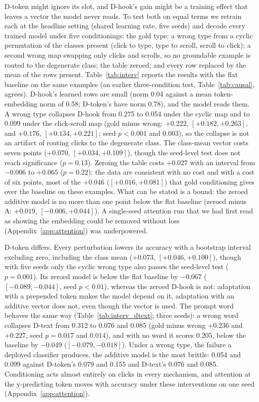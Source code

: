 \documentclass{article}
\begin{document}
D-token might ignore its slot, and D-hook's gain might be a training effect that leaves a vector the model never reads. To test both on equal terms we retrain each at the headline setting (shared learning rate, five seeds) and decode every trained model under five conditionings: the gold type; a wrong type from a cyclic permutation of the classes present (click to type, type to scroll, scroll to click); a second wrong map swapping only clicks and scrolls, so no groundable example is routed to the degenerate class; the table zeroed; and every row replaced by the mean of the rows present. Table~\ref{tab:interv} reports the results with the flat baseline on the same examples (an earlier three-condition test, Table~\ref{tab:causal}, agrees). D-hook's learned rows are small (norm 0.04 against a mean token-embedding norm of 0.58; D-token's have norm 0.78), and the model reads them. A wrong type collapses D-hook from 0.275 to 0.054 under the cyclic map and to 0.099 under the click-scroll map (gold minus wrong: $+0.222$, $[+0.182, +0.263]$, and $+0.176$, $[+0.134, +0.221]$; seed $p < 0.001$ and $0.003$), so the collapse is not an artifact of routing clicks to the degenerate class. The class-mean vector costs seven points ($+0.070$, $[+0.034, +0.109]$), though the seed-level test does not reach significance ($p = 0.13$). Zeroing the table costs $+0.027$ with an interval from $-0.006$ to $+0.065$ ($p = 0.22$): the data are consistent with no cost and with a cost of six points, most of the $+0.046$ ($[+0.016, +0.081]$) that gold conditioning gives over the baseline on these examples. What can be stated is a bound: the zeroed additive model is no more than one point below the flat baseline (zeroed minus A: $+0.019$, $[-0.006, +0.044]$). A single-seed attention run that we had first read as showing the embedding could be removed without loss (Appendix~\ref{app:attention}) was underpowered.

D-token differs. Every perturbation lowers its accuracy with a bootstrap interval excluding zero, including the class mean ($+0.073$, $[+0.046, +0.100]$), though with five seeds only the cyclic wrong type also passes the seed-level test ($p = 0.001$). Its zeroed model is below the flat baseline by $-0.067$ ($[-0.089, -0.044]$, seed $p < 0.01$), whereas the zeroed D-hook is not: adaptation with a prepended token makes the model depend on it, adaptation with an additive vector does not, even though the vector is used. The prompt word behaves the same way (Table~\ref{tab:interv_dtext}; three seeds): a wrong word collapses D-text from 0.312 to 0.076 and 0.085 (gold minus wrong $+0.236$ and $+0.227$, seed $p = 0.017$ and $0.014$), and with no word it scores 0.205, below the baseline by $-0.049$ ($[-0.079, -0.018]$). Under a wrong type, the failure a deployed classifier produces, the additive model is the most brittle: 0.054 and 0.099 against D-token's 0.079 and 0.155 and D-text's 0.076 and 0.085. Conditioning acts almost entirely on clicks in every mechanism, and attention at the y-predicting token moves with accuracy under these interventions on one seed (Appendix~\ref{app:attention}).
\end{document}
